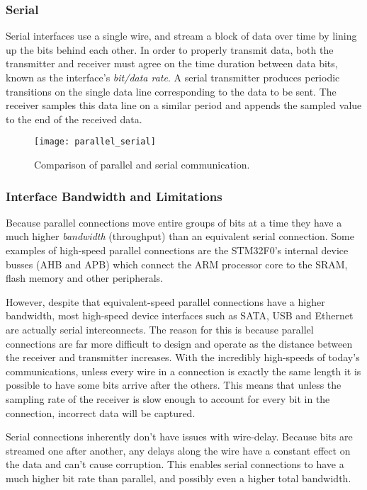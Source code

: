 \documentclass[11pt,fleqn]{book} %
\begin{document}
\subsubsection{Serial}
Serial interfaces use a single wire, and stream a block of data over time by lining up the bits behind each other. In order to properly transmit data, both the transmitter and receiver must agree on the time duration between data bits, known as the interface's \textit{bit/data rate}. A serial transmitter produces periodic transitions on the single data line corresponding to the data to be sent. The receiver samples this data line on a similar period and appends the sampled value to the end of the received data. 

\begin{figure}[]
    \centering\texttt{[image: parallel\_serial]}
    \caption{Comparison of parallel and serial communication.}
    \label{parallel_serial}
\end{figure}

\subsubsection{Interface Bandwidth and Limitations}
Because parallel connections move entire groups of bits at a time they have a much higher \textit{bandwidth} (throughput) than an equivalent serial connection. Some examples of high-speed parallel connections are the STM32F0's internal device busses (AHB and APB) which connect the ARM processor core to the SRAM, flash memory and other peripherals.

However, despite that equivalent-speed parallel connections have a higher bandwidth, most high-speed device interfaces such as SATA, USB and Ethernet are actually serial interconnects. The reason for this is because parallel connections are far more difficult to design and operate as the distance between the receiver and transmitter increases. With the incredibly high-speeds of today's communications, unless every wire in a connection is exactly the same length it is possible to have some bits arrive after the others. This means that unless the sampling rate of the receiver is slow enough to account for every bit in the connection, incorrect data will be captured.

Serial connections inherently don't have issues with wire-delay. Because bits are streamed one after another, any delays along the wire have a constant effect on the data and can't cause corruption. This enables serial connections to have a much higher bit rate than parallel, and possibly even a higher total bandwidth.
\end{document}

